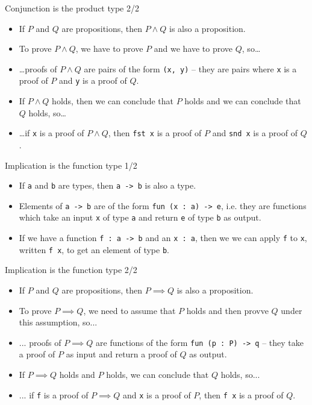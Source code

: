 \documentclass{beamer}
\newcommand{\m}[1]{\texttt{#1}}
\begin{document}
\begin{frame}{Conjunction is the product type 2/2}
\begin{itemize}
	\item If $P$ and $Q$ are propositions, then $P \land Q$ is also a proposition.
	\item To prove $P \land Q$, we have to prove $P$ and we have to prove $Q$, so\dots
	\item \dots proofs of $P \land Q$ are pairs of the form \m{(x, y)} -- they are pairs where \m{x} is a proof of $P$ and \m{y} is a proof of $Q$.
	\item If $P \land Q$ holds, then we can conclude that $P$ holds and we can conclude that $Q$ holds, so\dots
	\item \dots if \m{x} is a proof of $P \land Q$, then \m{fst x} is a proof of $P$ and \m{snd x} is a proof of $Q$.
\end{itemize}
\end{frame}

\begin{frame}{Implication is the function type 1/2}
\begin{itemize}
	\item If \m{a} and \m{b} are types, then \m{a -> b} is also a type.
	\item Elements of \m{a -> b} are of the form \m{fun (x :\ a) -> e}, i.e. they are functions which take an input \m{x} of type \m{a} and return \m{e} of type \m{b} as output.
	\item If we have a function \m{f :\ a -> b} and an \m{x :\ a}, then we we can apply \m{f} to \m{x}, written \m{f x}, to get an element of type \m{b}.
\end{itemize}
\end{frame}

\begin{frame}{Implication is the function type 2/2}
\begin{itemize}
	\item If $P$ and $Q$ are propositions, then $P \implies Q$ is also a proposition.
	\item To prove $P \implies Q$, we need to assume that $P$ holds and then provve $Q$ under this assumption, so...
	\item ... proofs of $P \implies Q$ are functions of the form \m{fun (p :\ P) -> q} -- they take a proof of $P$ as input and return a proof of $Q$ as output.
	\item If $P \implies Q$ holds and $P$ holds, we can conclude that $Q$ holds, so...
	\item ... if \m{f} is a proof of $P \implies Q$ and \m{x} is a proof of $P$, then \m{f x} is a proof of $Q$.
\end{itemize}
\end{frame}
\end{document}
